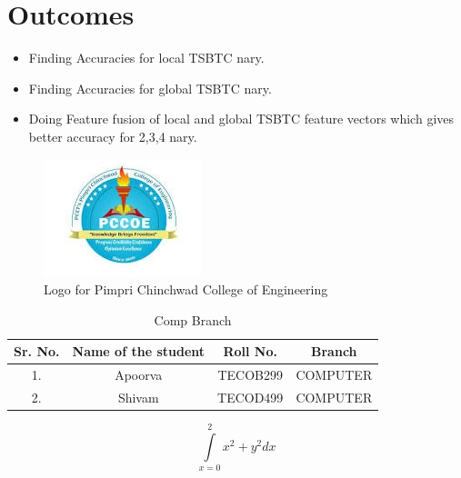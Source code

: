 \section{Outcomes}
\begin{itemize}
	\item Finding Accuracies for local TSBTC nary.
	\item Finding Accuracies for global TSBTC nary.
	\item Doing Feature fusion of local and global TSBTC feature vectors which gives better accuracy for 2,3,4 nary.
\end{itemize}


\begin{figure}[h!]
	\centering
	\includegraphics[width=0.7\linewidth]{Logo}
	\caption[Fig. 1]{Logo for Pimpri Chinchwad College of Engineering}
	\label{fig:logo}
\end{figure}

\begin{table}[h!]
	\caption[List of students]{Comp Branch}
	\label{Table 1}
	\centering
\begin{tabular}{|c|c|c|c|}
	\hline
	Sr. No.& Name of the student  & Roll No.  & Branch  \\
	\hline
	1.& Apoorva & TECOB299  & COMPUTER  \\
	\hline
	2.& Shivam & TECOD499  & COMPUTER \\
	\hline
\end{tabular}
\end{table}

\begin{equation}
	\int\limits_{x = 0}^2 {{x^2} + {y^2}} dx
\end{equation}



